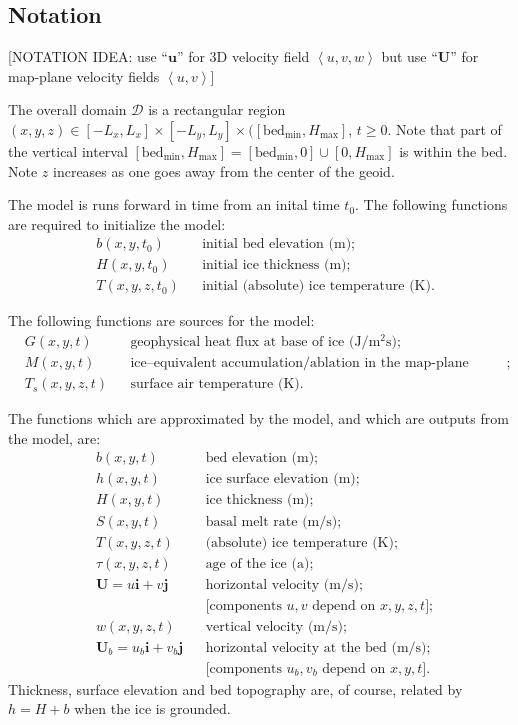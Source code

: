 \documentclass[12pt,final]{amsart}%
\theoremstyle{plain}
\theoremstyle{definition}
\theoremstyle{remark}
\newcommand{\ihat}{\mathbf{i}}
\newcommand{\jhat}{\mathbf{j}}
\newcommand{\bu}{{\mathbf{u}}}
\newcommand{\bU}{{\mathbf{U}}}
\begin{document}
\subsection*{Notation}  [NOTATION IDEA: use ``$\bu$'' for 3D velocity field $\left<u,v,w\right>$ but use ``$\bU$'' for map-plane velocity fields $\left<u,v\right>$]

The overall domain $\mathcal{D}$ is a rectangular region $(x,y,z)\in [-L_x,L_x]\times [-L_y,L_y]\times([\text{bed}_{\text{min}},H_{\text{max}}]$, $t\ge 0$.  Note that part of the vertical interval $[\text{bed}_{\text{min}},H_{\text{max}}]=[\text{bed}_{\text{min}},0]\cup[0,H_{\text{max}}]$ is within the bed.  Note $z$ increases as one goes away from the center of the geoid.

The model is runs forward in time from an inital time $t_0$.  The following functions are required to initialize the model:
\begin{align*}
&b(x,y,t_0) &&\text{initial bed elevation (m)}; \\
&H(x,y,t_0) &&\text{initial ice thickness (m)};\\
&T(x,y,z,t_0) &&\text{initial (absolute) ice temperature (K)}.
\end{align*}

The following functions are sources for the model:
\begin{align*}
&G(x,y,t) &&\text{geophysical heat flux at base of ice (J/$\text{m}^2$s)};\\
&M(x,y,t) &&\text{ice--equivalent accumulation/ablation in the map-plane (m/s)};\\
&T_s(x,y,z,t) &&\text{surface air temperature (K)}.
\end{align*}

The functions which are approximated by the model, and which are outputs from the model, are:
\begin{align*}
&b(x,y,t) &&\text{bed elevation (m)}; \\
&h(x,y,t) &&\text{ice surface elevation (m)};\\
&H(x,y,t) &&\text{ice thickness (m)};\\
&S(x,y,t) &&\text{basal melt rate (m/s);}\\
&T(x,y,z,t) &&\text{(absolute) ice temperature (K)};\\
&\tau(x,y,z,t) &&\text{age of the ice (a)};\\
&\bU=u\ihat+v\jhat &&\text{horizontal velocity (m/s);}\\
&&& \text{[components } u,v \text{ depend on } x,y,z,t];\\
&w(x,y,z,t) &&\text{vertical velocity (m/s);}\\
&\bU_b=u_b\ihat+v_b\jhat &&\text{horizontal velocity at the bed (m/s);}\\
&&& \text{[components } u_b,v_b \text{ depend on } x,y,t].
\end{align*}
Thickness, surface elevation and bed topography are, of course, related by $h=H+b$ when the ice is grounded.
\end{document}
